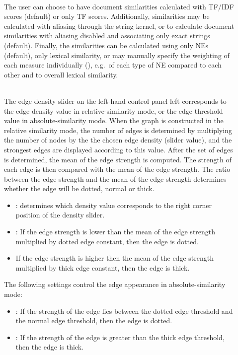 \begin{description}
\item[] \hfill \\
The user can choose to have document similarities calculated with TF/IDF scores (default) or only TF scores. Additionally, similarities may be calculated with aliasing through the string kernel, or to calculate document similarities with aliasing disabled and associating only exact strings (default). Finally, the similarities can be calculated using only NEs (default), only lexical similarity, or may manually specify the weighting of each measure individually (), e.g.\ of each type of NE compared to each other and to overall lexical similarity. 
\item[]\hfill \\
The edge density slider on the left-hand control panel left corresponds to the edge density value in relative-similarity mode, or the edge threshold value in absolute-similarity mode. When the graph is constructed in the relative similarity mode, the number of edges is determined by multiplying the number of nodes by the the chosen edge density (slider value), and the strongest edges are displayed according to this value. After the set of edges is determined, the mean of the edge strength is computed. The strength of each edge is then compared with the mean of the edge strength. The ratio between the edge strength and the mean of the edge strength determines whether the edge will be dotted, normal or thick.

\begin{itemize}
\item {}: determines which density value corresponds to the right corner position of the density slider.

\item {}: If the edge strength is lower than the mean of the edge strength multiplied by dotted edge constant, then the edge is dotted.

\item {} If the edge strength is higher then the mean of the edge strength multiplied by thick edge constant, then the edge is thick.
\end{itemize}

The following settings control the edge appearance in absolute-similarity mode:

\begin{itemize}
\item {}: If the strength of the edge lies between the dotted edge threshold and the normal edge threshold, then the edge is dotted.
\item {}: If the strength of the edge is greater than the thick edge threshold, then the edge is thick.
\end{itemize}


\end{description}
